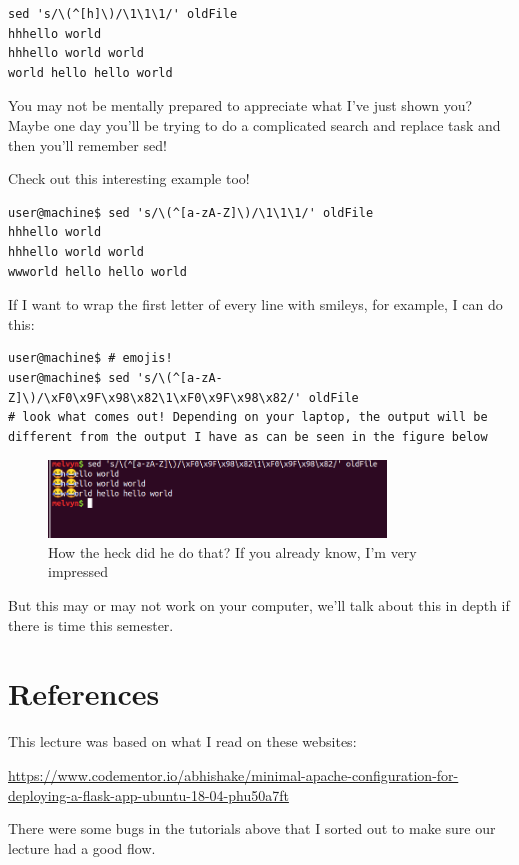 \documentclass[10pt]{article}
\begin{document}
\begin{lstlisting}[style=term]
sed 's/\(^[h]\)/\1\1\1/' oldFile
hhhello world
hhhello world world
world hello hello world
\end{lstlisting}

You may not be mentally prepared to appreciate what I've just shown you? Maybe one day you'll be trying to do a complicated search and replace task and then you'll remember sed!

Check out this interesting example too!

\begin{lstlisting}[style=term]
user@machine$ sed 's/\(^[a-zA-Z]\)/\1\1\1/' oldFile
hhhello world
hhhello world world
wwworld hello hello world
\end{lstlisting}

If I want to wrap the first letter of every line with smileys, for example, I can do this:

\begin{lstlisting}[style=term]
user@machine$ # emojis!
user@machine$ sed 's/\(^[a-zA-Z]\)/\xF0\x9F\x98\x82\1\xF0\x9F\x98\x82/' oldFile
# look what comes out! Depending on your laptop, the output will be different from the output I have as can be seen in the figure below
\end{lstlisting}


\begin{figure}[h]
  \centering
    \includegraphics[width=0.8\textwidth]{mayOrMayNotWorkForYou.png}
  \caption{How the heck did he do that? If you already know, I'm very impressed}
\end{figure}

But this may or may not work on your computer, we'll talk about this in depth if there is time this semester.

\section{References}
This lecture was based on what I read  on these websites:

\url{https://www.codementor.io/abhishake/minimal-apache-configuration-for-deploying-a-flask-app-ubuntu-18-04-phu50a7ft}


There were some bugs in the tutorials above that I sorted out to make sure our lecture had a good flow.
\end{document}
